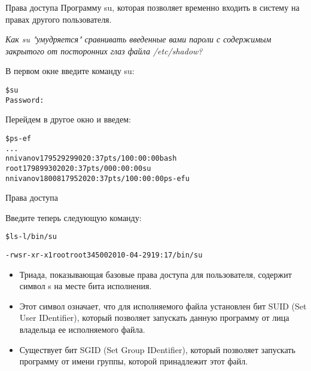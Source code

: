 \documentclass{beamer}
\begin{document}
\begin{frame}[fragile]{Права доступа}
Программу su, которая позволяет временно входить в систему на правах другого пользователя. 

\textit{Как su "умудряется" сравнивать введенные вами пароли с содержимым закрытого от посторонних глаз файла /etc/shadow? }
\begin{block}{В первом окне введите команду su:}
\begin{alltt}
\$ su
Password:
\end{alltt}
\end{block}
\begin{block}{Перейдем в другое окно и введем:}
\begin{alltt}
\$ ps -ef
...
nnivanov 17952 9299 0 20:37 pts/1 00:00:00 bash
root 17989 9302 0 20:37 pts/0 00:00:00 su
nnivanov 18008 17952 0 20:37 pts/1 00:00:00 ps -efu
\end{alltt}
\end{block}
\end{frame}

\begin{frame}[fragile]{Права доступа}
\begin{block}{Введите теперь следующую команду:}
\begin{alltt}
\$ ls -l /bin/su

-rwsr-xr-x 1 root root 34500 2010-04-29 19:17 /bin/su
\end{alltt}
\end{block}
\begin{itemize}
\item Триада, показывающая базовые права доступа для пользователя, содержит символ s на месте бита исполнения. 
\item Этот символ означает, что для исполняемого файла установлен бит SUID (Set User IDentifier), который позволяет запускать данную программу от лица владельца ее исполняемого файла. 
\item Существует бит SGID (Set Group IDentifier), который позволяет запускать программу от имени группы, которой принадлежит этот файл.
\end{itemize}
\end{frame}
\end{document}
